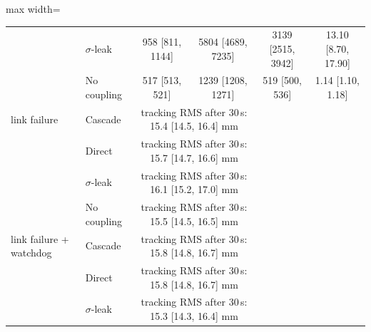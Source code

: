 \begin{table}[htbp]
\begin{adjustbox}{max width=\linewidth}
\begin{tabular}{@{}llcccc@{}}
 & $\sigma$-leak & 958 [811, 1144] & 5804 [4689, 7235] & 3139 [2515, 3942] & 13.10 [8.70, 17.90]\\
 & No coupling & 517 [513, 521] & 1239 [1208, 1271] & 519 [500, 536] & 1.14 [1.10, 1.18]\\
\addlinespace
link failure & Cascade & \multicolumn{2}{c}{tracking RMS after 30\,s: 15.4 [14.5, 16.4] mm} & & \\
 & Direct & \multicolumn{2}{c}{tracking RMS after 30\,s: 15.7 [14.7, 16.6] mm} & & \\
 & $\sigma$-leak & \multicolumn{2}{c}{tracking RMS after 30\,s: 16.1 [15.2, 17.0] mm} & & \\
 & No coupling & \multicolumn{2}{c}{tracking RMS after 30\,s: 15.5 [14.5, 16.5] mm} & & \\
\addlinespace
link failure + watchdog & Cascade & \multicolumn{2}{c}{tracking RMS after 30\,s: 15.8 [14.8, 16.7] mm} & & \\
 & Direct & \multicolumn{2}{c}{tracking RMS after 30\,s: 15.8 [14.8, 16.7] mm} & & \\
 & $\sigma$-leak & \multicolumn{2}{c}{tracking RMS after 30\,s: 15.3 [14.3, 16.4] mm} & & \\
\bottomrule\end{tabular}
\end{adjustbox}
\end{table}
